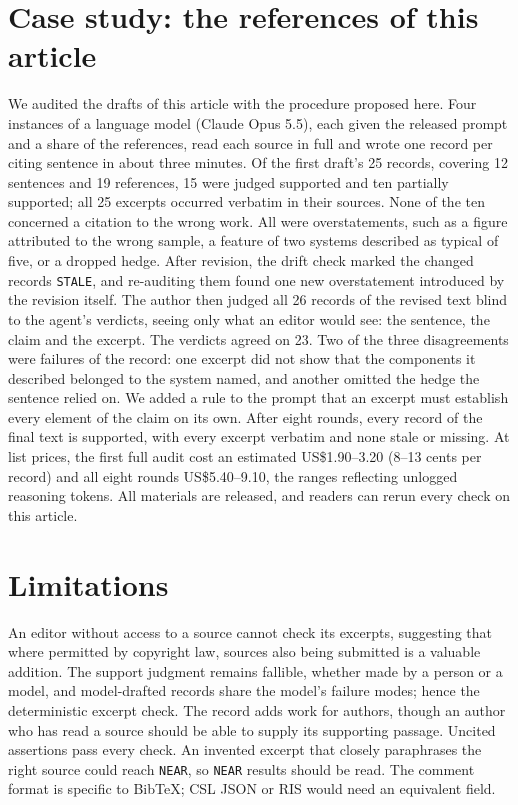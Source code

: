 \documentclass[11pt]{article}
\begin{document}
\section{Case study: the references of this article}

We audited the drafts of this article with the procedure proposed here. Four instances of a language model (Claude Opus 5.5), each given the released prompt and a share of the references, read each source in full and wrote one record per citing sentence in about three minutes. Of the first draft's 25 records, covering 12 sentences and 19 references, 15 were judged supported and ten partially supported; all 25 excerpts occurred verbatim in their sources. None of the ten concerned a citation to the wrong work. All were overstatements, such as a figure attributed to the wrong sample, a feature of two systems described as typical of five, or a dropped hedge. After revision, the drift check marked the changed records \texttt{STALE}, and re-auditing them found one new overstatement introduced by the revision itself. The author then judged all 26 records of the revised text blind to the agent's verdicts, seeing only what an editor would see: the sentence, the claim and the excerpt. The verdicts agreed on 23. Two of the three disagreements were failures of the record: one excerpt did not show that the components it described belonged to the system named, and another omitted the hedge the sentence relied on. We added a rule to the prompt that an excerpt must establish every element of the claim on its own. After eight rounds, every record of the final text is supported, with every excerpt verbatim and none stale or missing. At list prices, the first full audit cost an estimated US\$1.90--3.20 (8--13 cents per record) and all eight rounds US\$5.40--9.10, the ranges reflecting unlogged reasoning tokens. All materials are released, and readers can rerun every check on this article.

\section{Limitations}

An editor without access to a source cannot check its excerpts, suggesting that where permitted by copyright law, sources also being submitted is a valuable addition. The support judgment remains fallible, whether made by a person or a model, and model-drafted records share the model's failure modes; hence the deterministic excerpt check. The record adds work for authors, though an author who has read a source should be able to supply its supporting passage. Uncited assertions pass every check. An invented excerpt that closely paraphrases the right source could reach \texttt{NEAR}, so \texttt{NEAR} results should be read. The comment format is specific to BibTeX; CSL JSON or RIS would need an equivalent field.
\end{document}
